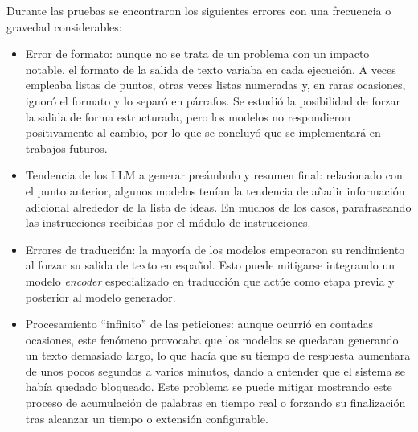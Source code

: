 Durante las pruebas se encontraron los siguientes errores con una frecuencia o gravedad considerables:
\begin{itemize}
\item Error de formato:
	  aunque no se trata de un problema con un impacto notable,
	  el formato de la salida de texto variaba en cada ejecución.
	  A veces empleaba listas de puntos, otras veces listas numeradas y, en raras ocasiones,
	  ignoró el formato y lo separó en párrafos.
	  Se estudió la posibilidad de forzar la salida de forma estructurada, pero los modelos no
	  respondieron positivamente al cambio, por lo que se concluyó que se implementará en trabajos futuros.
\item Tendencia de los LLM a generar preámbulo y resumen final:
      relacionado con el punto anterior,
	  algunos modelos tenían la tendencia de añadir información adicional alrededor de la lista de ideas.
	  En muchos de los casos, parafraseando las instrucciones recibidas por el módulo de instrucciones.
\item Errores de traducción: la mayoría de los modelos empeoraron su rendimiento al forzar su salida de 
      texto en español. Esto puede mitigarse integrando un modelo \textit{encoder} especializado en traducción
	  que actúe como etapa previa y posterior al modelo generador.
\item Procesamiento ``infinito'' de las peticiones:
	  aunque ocurrió en contadas ocasiones, este fenómeno provocaba que los modelos se quedaran
	  generando un texto demasiado largo, lo que hacía que su tiempo de respuesta aumentara
	  de unos pocos segundos a varios minutos, dando a entender que el sistema se había quedado bloqueado.
	  Este problema se puede mitigar mostrando este proceso de acumulación de palabras en tiempo real
	  o forzando su finalización tras alcanzar un tiempo o extensión configurable.
\end{itemize}
